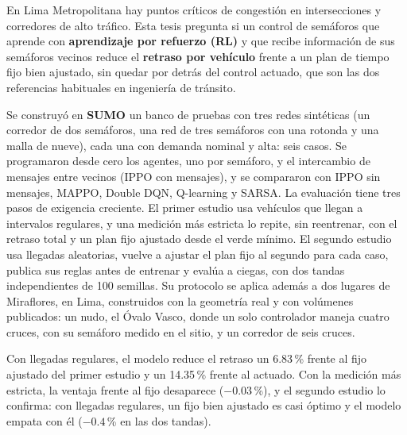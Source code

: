 
En Lima Metropolitana hay puntos críticos de congestión en intersecciones y corredores de alto tráfico. Esta tesis pregunta si un control de semáforos que aprende con \textbf{aprendizaje por refuerzo (RL)} y que recibe información de sus semáforos vecinos reduce el \textbf{retraso por vehículo} frente a un plan de tiempo fijo bien ajustado, sin quedar por detrás del control actuado, que son las dos referencias habituales en ingeniería de tránsito.

Se construyó en \textbf{SUMO} un banco de pruebas con tres redes sintéticas (un corredor de dos semáforos, una red de tres semáforos con una rotonda y una malla de nueve), cada una con demanda nominal y alta: seis casos. Se programaron desde cero los agentes, uno por semáforo, y el intercambio de mensajes entre vecinos (IPPO con mensajes), y se compararon con IPPO sin mensajes, MAPPO, Double DQN, Q-learning y SARSA. La evaluación tiene tres pasos de exigencia creciente. El primer estudio usa vehículos que llegan a intervalos regulares, y una medición más estricta lo repite, sin reentrenar, con el retraso total y un plan fijo ajustado desde el verde mínimo. El segundo estudio usa llegadas aleatorias, vuelve a ajustar el plan fijo al segundo para cada caso, publica sus reglas antes de entrenar y evalúa a ciegas, con dos tandas independientes de 100 semillas. Su protocolo se aplica además a dos lugares de Miraflores, en Lima, construidos con la geometría real y con volúmenes publicados: un nudo, el Óvalo Vasco, donde un solo controlador maneja cuatro cruces, con su semáforo medido en el sitio, y un corredor de seis cruces.

Con llegadas regulares, el modelo reduce el retraso un 6.83\,\% frente al fijo ajustado del primer estudio y un 14.35\,\% frente al actuado. Con la medición más estricta, la ventaja frente al fijo desaparece ($-0.03$\,\%), y el segundo estudio lo confirma: con llegadas regulares, un fijo bien ajustado es casi óptimo y el modelo empata con él ($-0.4$\,\% en las dos tandas).

